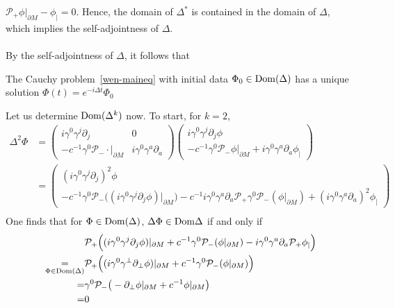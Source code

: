 $\mathcal{P}_+\phi\vert_{\partial M} - \phi_| = 0$.
Hence, the domain of $\Delta^*$ is contained in the domain of $\Delta$, which implies the self-adjointness of $\Delta$.\\\\
By the self-adjointness of $\Delta$, it follows that 
\begin{proposition}\label{wen-propwellposedness}
The Cauchy problem~\cref{wen-maineq} with initial data $\Phi_0\in\mathrm{Dom}(\Delta)$ has a unique solution $\Phi(t) = e^{-i\Delta t}\Phi_0 $
\end{proposition}
Let us determine $\mathrm{Dom} (\Delta^k)$ now. 
To start, for $k =2$,
\begin{equation}\label{wen-deltak}
\begin{split}
\Delta^2 \Phi & =  
\begin{pmatrix} i \gamma^0 \gamma^j \partial_j & 0 \\
- c^{-1} \gamma^0 \mathcal{P}_- \cdot \vert_{\partial M} & i \gamma^0 \gamma^a \partial_a \end{pmatrix}
\begin{pmatrix}   i \gamma^0 \gamma^j \partial_j \phi \\
- c^{-1} \gamma^0 \mathcal{P}_- \phi\vert_{\partial M} + i \gamma^0 \gamma^a \partial_a  \phi_| \end{pmatrix} \\
&= 
\begin{pmatrix} (i\gamma^0\gamma^j\partial_j)^2 \phi \\
-c^{-1}\gamma^0\mathcal{P}_- \big( (i\gamma^0\gamma^j\partial_j \phi)\vert_{\partial M}\big)
-c^{-1}i \gamma^0\gamma^a\partial_a \mathcal{P}_+ \gamma^0 \mathcal{P}_-(\phi\vert_{\partial M})
+ (i\gamma^0\gamma^a\partial_a)^2\phi_| \end{pmatrix}
\\
\end{split}
\end{equation}
One finds that for $\Phi \in \mathrm{Dom}(\Delta)$, $\Delta \Phi \in \mathrm{Dom} \Delta$ if and only if
\begin{equation*}
\begin{split}
&\mathcal{P}_+\Big( ( i\gamma^0\gamma^j \partial_j \phi ) \vert_{\partial M} +
 c^{-1}\gamma^0 \mathcal{P}_- ( \phi \vert_{\partial M})
- i \gamma^0 \gamma^a \partial_a \mathcal{P}_+\phi _| \Big) \\
\underset{\Phi\in \mathrm{Dom}(\Delta)}{ = }& 
\mathcal{P}_+\Big( (i\gamma^0\gamma^\bot \partial_\bot\phi)\vert_{\partial M} +
c^{-1}\gamma^0 \mathcal{P}_- ( \phi \vert_{\partial M}) \Big) \\ 
= & 
\gamma^0\mathcal{P}_-\big(- \partial_\bot \phi \vert_{\partial M} + c^{-1} \phi\vert_{\partial M}\big)
\\ = & 0
\end{split}
\end{equation*}
